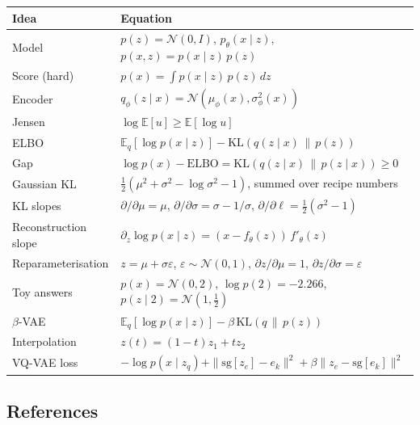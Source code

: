 \begin{center}
\begin{tabular}{>{\raggedright\arraybackslash}p{} >{\raggedright\arraybackslash}p{}}
\toprule
Idea & Equation \\
\midrule
Model & $p(z) = \mathcal{N}(0, I)$, \quad $p_\theta(x \mid z)$, \quad $p(x,z) = p(x \mid z)\,p(z)$ \\
Score (hard) & $p(x) = \int p(x \mid z)\,p(z)\,dz$ \\
Encoder & $q_\phi(z \mid x) = \mathcal{N}(\mu_\phi(x), \sigma^2_\phi(x))$ \\
Jensen & $\log\mathbb{E}[u] \ge \mathbb{E}[\log u]$ \\
ELBO & $\mathbb{E}_q[\log p(x \mid z)] - \mathrm{KL}(q(z \mid x)\,\|\,p(z))$ \\
Gap & $\log p(x) - \mathrm{ELBO} = \mathrm{KL}(q(z \mid x)\,\|\,p(z \mid x)) \ge 0$ \\
Gaussian KL & $\tfrac12(\mu^2 + \sigma^2 - \log\sigma^2 - 1)$, summed over recipe numbers \\
KL slopes & $\partial/\partial\mu = \mu$, \quad $\partial/\partial\sigma = \sigma - 1/\sigma$, \quad $\partial/\partial\ell = \tfrac12(\sigma^2 - 1)$ \\
Reconstruction slope & $\partial_z \log p(x \mid z) = (x - f_\theta(z))\,f'_\theta(z)$ \\
Reparameterisation & $z = \mu + \sigma\varepsilon$, \quad $\varepsilon \sim \mathcal{N}(0,1)$, \quad $\partial z/\partial\mu = 1$, \quad $\partial z/\partial\sigma = \varepsilon$ \\
Toy answers & $p(x) = \mathcal{N}(0,2)$, \quad $\log p(2) = -2.266$, \quad $p(z \mid 2) = \mathcal{N}(1, \tfrac12)$ \\
$\beta$-VAE & $\mathbb{E}_q[\log p(x \mid z)] - \beta\,\mathrm{KL}(q \,\|\, p(z))$ \\
Interpolation & $z(t) = (1-t)z_1 + t z_2$ \\
VQ-VAE loss & $-\log p(x \mid z_q) + \|\mathrm{sg}[z_e] - e_k\|^2 + \beta\|z_e - \mathrm{sg}[e_k]\|^2$ \\
\bottomrule
\end{tabular}
\end{center}

\subsection*{References}

